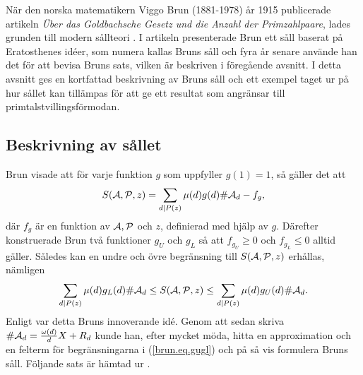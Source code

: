 \begin{comment}
När den norska matematikern Viggo Brun (1881-1978) år 1915 publicerade artikeln \textit{Über das Goldbachsche Gesetz und die Anzahl der Primzahlpaare}, lades grunden till modern sållteori \cite{ViggoBrun}. 
I artikeln presenterade Brun ett såll baserat på Eratosthenes idéer, som numera kallas Bruns såll och fyra år senare använde han det för att bevisa att summan av reciproker $\frac{1}{p_1}+\frac{1}{p_2}+...$ av primtalstvillingar $p_1,p_2,...$ konvergerar \cite{ViggoBrun}.
I detta avsnitt ges en kortfattad beskrivning av Bruns såll och ett exempel taget ur \cite{cojocarumurty} på hur sållet kan tillämpas för att ge ett resultat som angränsar till primtalstvillingsförmodan.
\end{comment}

När den norska matematikern Viggo Brun (1881-1978) år 1915 publicerade artikeln \textit{Über das Goldbachsche Gesetz und die Anzahl der Primzahlpaare}, lades grunden till modern sållteori \cite{ViggoBrun}. 
I artikeln presenterade Brun ett såll baserat på Eratosthenes idéer, som numera kallas Bruns såll och fyra år senare använde han det för att bevisa Bruns sats, vilken är beskriven i föregående avsnitt.
I detta avsnitt ges en kortfattad beskrivning av Bruns såll och ett exempel taget ur \cite{cojocarumurty} på hur sållet kan tillämpas för att ge ett resultat som angränsar till primtalstvillingsförmodan.


\subsection{Beskrivning av sållet}
Brun visade att för varje funktion $g$ som uppfyller $g(1)=1$,
så gäller det att
\begin{equation*}
    \S{A}{P}{z} 
    = \sum_{d \mid P(z)} \mu(d) g(d) \card\A_d 
    - f_g,
\end{equation*} %
där $f_g$ är en funktion av $\A,\P$ och $z$, definierad med hjälp av $g$. 
Därefter konstruerade Brun två funktioner $g_U$ och $g_L$ så att $f_{g_U}\geq 0$ och $f_{g_L}\leq 0$ alltid gäller. 
Således kan en undre och övre begränsning till $\S{A}{P}{z}$ erhållas, nämligen
\begin{equation}\label{brun.eq.gugl}
    \sum_{d \mid P(z)} \mu(d) g_L(d) \card\A_d 
    \leq \S{A}{P}{z} 
    \leq \sum_{d \mid P(z)} \mu(d) g_U(d) \card\A_d.
\end{equation}
Enligt \cite{cojocarumurty} var detta Bruns innoverande idé.
Genom att sedan skriva $\card\A_d=\frac{\omega(d)}{d}X + R_d$ kunde han, efter mycket möda, hitta en approximation och en felterm för begränsningarna i (\ref{brun.eq.gugl}) och på så vis formulera Bruns såll. Följande sats är hämtad ur \cite[Kap. 6.2]{cojocarumurty}.


